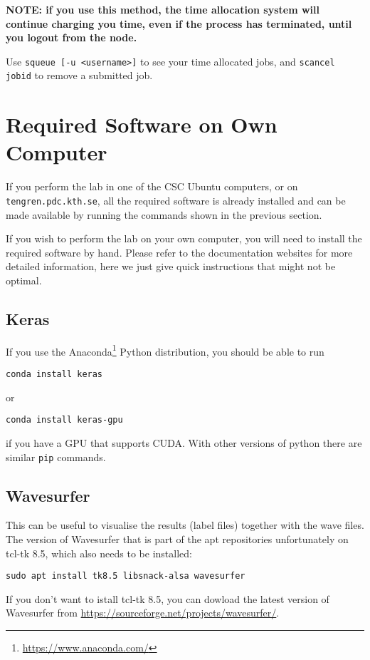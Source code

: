 \documentclass{nada-ten}
\begin{document}
\textbf{NOTE: if you use this method, the time allocation system will continue charging you time, even if the process has terminated, until you logout from the node.}

Use \verb|squeue [-u <username>]| to see your time allocated jobs, and \verb|scancel jobid| to remove a submitted job.

\clearpage

\section{Required Software on Own Computer}
If you perform the lab in one of the CSC Ubuntu computers, or on \texttt{tengren.pdc.kth.se}, all the required software is already installed and can be made available by running the commands shown in the previous section.

If you wish to perform the lab on your own computer, you will need to install the required software by hand. Please refer to the documentation websites for more detailed information, here we just give quick instructions that might not be optimal.

\subsection{Keras}
If you use the Anaconda\footnote{\url{https://www.anaconda.com/}} Python distribution, you should be able to run
\begin{verbatim}
conda install keras
\end{verbatim}
or
\begin{verbatim}
conda install keras-gpu
\end{verbatim}
if you have a GPU that supports CUDA. With other versions of python there are similar \texttt{pip} commands.

\subsection{Wavesurfer}
This can be useful to visualise the results (label files) together with the wave files. The version of Wavesurfer that is part of the apt repositories unfortunately on tcl-tk 8.5, which also needs to be installed:
\begin{verbatim}
sudo apt install tk8.5 libsnack-alsa wavesurfer
\end{verbatim}
If you don't want to istall tcl-tk 8.5, you can dowload the latest version of Wavesurfer from \url{https://sourceforge.net/projects/wavesurfer/}.
\end{document}

